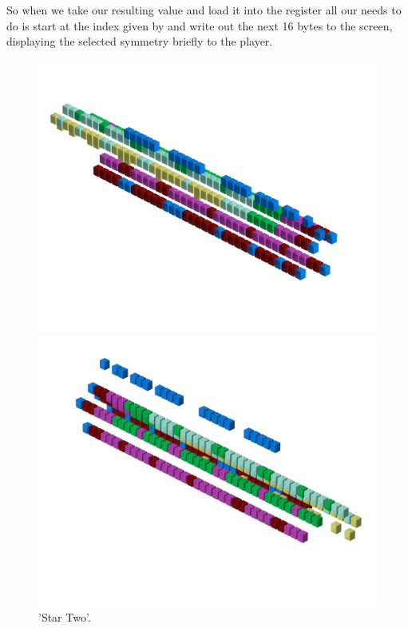 So when we take our resulting value and load it into the  register all our  needs to do is start at the 
index given by  and write out the next 16 bytes to the screen, displaying the selected symmetry briefly to the player.
\clearpage
\begin{figure}[H]
    \centering
    \begin{adjustbox}{width=12cm,center}
      \includegraphics[width=12cm]{src/patterns/pattern3-45.png}%
    \end{adjustbox}
    \begin{adjustbox}{width=12cm,margin=0cm -4cm}
      \includegraphics[width=12cm]{src/patterns/pattern3-225.png}%
    \end{adjustbox}
\caption{'Star Two'.}
\end{figure}
\clearpage

